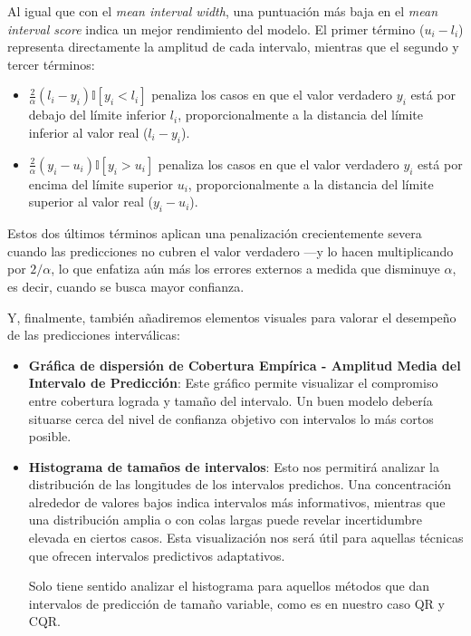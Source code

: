 \begin{itemize}
    Al igual que con el \textit{mean interval width}, una puntuación más baja en el \textit{mean interval score} indica un mejor rendimiento del modelo. El primer término ($u_i-l_i$) representa directamente la amplitud de cada intervalo, mientras que el segundo y tercer términos:

    \begin{itemize}
        \item $\frac{2}{\alpha} \left( l_i-y_i \right) \mathbb{I}\left[ y_i<l_i \right]$ penaliza los casos en que el valor verdadero $y_i$ está por debajo del límite inferior $l_i$, proporcionalmente a la distancia del límite inferior al valor real ($l_i-y_i$).
        \item $\frac{2}{\alpha}  \left( y_i-u_i \right) \mathbb{I}\left[ y_i>u_i \right]$ penaliza los casos en que el valor verdadero $y_i$ está por encima del límite superior $u_i$, proporcionalmente a la distancia del límite superior al valor real ($y_i-u_i$).
    \end{itemize}

    Estos dos últimos términos aplican una penalización crecientemente severa cuando las predicciones no cubren el valor verdadero ---y lo hacen multiplicando por $2/\alpha$, lo que enfatiza aún más los errores externos a medida que disminuye $\alpha$, es decir, cuando se busca mayor confianza.

\end{itemize}

Y, finalmente, también añadiremos elementos visuales para valorar el desempeño de las predicciones interválicas:

\begin{itemize}

    \item \textbf{Gráfica de dispersión de Cobertura Empírica - Amplitud Media del Intervalo de Predicción}: Este gráfico permite visualizar el compromiso entre cobertura lograda y tamaño del intervalo. Un buen modelo debería situarse cerca del nivel de confianza objetivo con intervalos lo más cortos posible. 

    \item \textbf{Histograma de tamaños de intervalos}: Esto nos permitirá analizar la distribución de las longitudes de los intervalos predichos. Una concentración alrededor de valores bajos indica intervalos más informativos, mientras que una distribución amplia o con colas largas puede revelar incertidumbre elevada en ciertos casos. Esta visualización nos será útil para aquellas técnicas que ofrecen intervalos predictivos adaptativos. 
    
    Solo tiene sentido analizar el histograma para aquellos métodos que dan intervalos de predicción de tamaño variable, como es en nuestro caso \acrshort{QR} y \acrshort{CQR}. 

\end{itemize}

